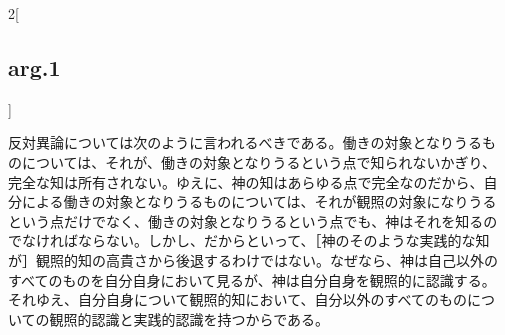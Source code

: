 \documentclass[paper=a4paper,fontsize=10pt,jafontsize=9pt,titlepage]{jlreq}
\begin{document}
\begin{paracol}{2}[\subsection{arg.1}]
\switchcolumn

反対異論については次のように言われるべきである。働きの対象となりうるも
のについては、それが、働きの対象となりうるという点で知られないかぎり、
完全な知は所有されない。ゆえに、神の知はあらゆる点で完全なのだから、自
分による働きの対象となりうるものについては、それが観照の対象になりうる
という点だけでなく、働きの対象となりうるという点でも、神はそれを知るの
でなければならない。しかし、だからといって、［神のそのような実践的な知
が］観照的知の高貴さから後退するわけではない。なぜなら、神は自己以外の
すべてのものを自分自身において見るが、神は自分自身を観照的に認識する。
それゆえ、自分自身について観照的知において、自分以外のすべてのものにつ
いての観照的認識と実践的認識を持つからである。

\end{paracol}


\newpage
\end{document}
